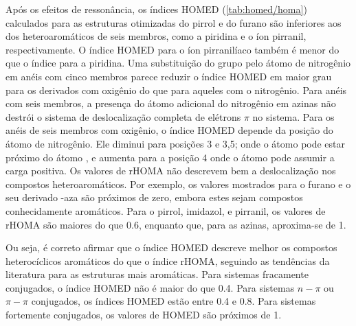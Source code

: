 Após os efeitos de ressonância, os índices \gls{HOMED} (\autoref{tab:homed/homa}) calculados para as estruturas otimizadas do pirrol e do furano são inferiores aos dos heteroaromáticos de seis membros, como a piridina e o íon pirranil, respectivamente. O índice \gls{HOMED} para o íon pirranilíaco também é menor do que o índice para a piridina. Uma substituição do grupo  pelo átomo de nitrogênio em anéis com cinco membros parece reduzir o índice \gls{HOMED} em maior grau para os derivados com oxigênio do que para aqueles com o nitrogênio. Para anéis com seis membros, a presença do átomo adicional do nitrogênio em azinas não destrói o sistema de deslocalização completa de elétrons $\pi$ no sistema. Para os anéis de seis membros com oxigênio, o índice \gls{HOMED} depende da posição do átomo de nitrogênio. Ele diminui para posições 3 e 3,5; onde o átomo  pode estar próximo do átomo , e aumenta para a posição 4 onde o átomo  pode assumir a carga positiva. Os valores de \gls{rHOMA} não descrevem bem a deslocalização nos compostos heteroaromáticos. Por exemplo, os valores mostrados para o furano e o seu derivado -aza são próximos de zero, embora estes sejam compostos conhecidamente aromáticos. Para o pirrol, imidazol, e pirranil, os valores de \gls{rHOMA} são maiores do que 0.6, enquanto que, para as azinas, aproxima-se de 1. 

Ou seja, é correto afirmar que o índice \gls{HOMED} descreve melhor os compostos heterocíclicos aromáticos do que o índice \gls{rHOMA}, seguindo as tendências da literatura para as estruturas mais aromáticas. Para sistemas fracamente conjugados, o índice \gls{HOMED} não é maior do que 0.4. Para sistemas $n-\pi$ ou $\pi-\pi$ conjugados, os índices \gls{HOMED} estão entre 0.4 e 0.8. Para sistemas fortemente conjugados, os valores de \gls{HOMED} são próximos de 1.

